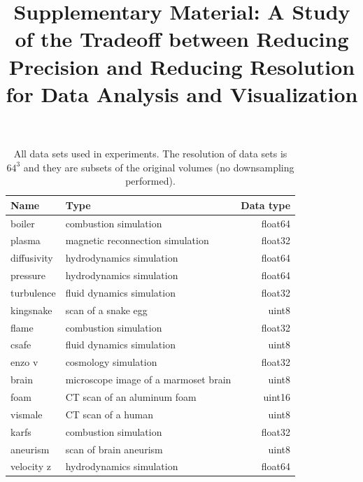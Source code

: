 \documentclass{article}
\title{Supplementary Material: A Study of the Tradeoff between Reducing Precision and Reducing Resolution for Data Analysis and Visualization}
\date{}
\begin{document}
\maketitle


\begin{table}[ht]
        \caption{All data sets used in experiments. The resolution of data sets is $64^3$ and
        they are subsets of the original volumes (no downsampling performed).}
  \centering
  \begin{tabular}{llr}
  \toprule
  Name & Type & Data type \\
  \midrule
  boiler & combustion simulation& float64\\
  plasma & magnetic reconnection simulation& float32\\
  diffusivity & hydrodynamics simulation& float64\\
  pressure & hydrodynamics simulation& float64\\
  turbulence & fluid dynamics simulation& float32\\
  kingsnake & scan of a snake egg & uint8\\
  flame & combustion simulation& float32\\
  csafe & fluid dynamics simulation& uint8\\
  enzo v & cosmology simulation& float32\\
  brain & microscope image of a marmoset brain & uint8\\
  foam & CT scan of an aluminum foam & uint16\\
  vismale & CT scan of a human & uint8 \\
  karfs & combustion simulation& float32\\
  aneurism      & scan of brain aneurism & uint8 \\
  velocity z & hydrodynamics simulation& float64 \\
  \bottomrule
  \end{tabular}\label{tbl:data-sets}
\end{table}
\end{document}
